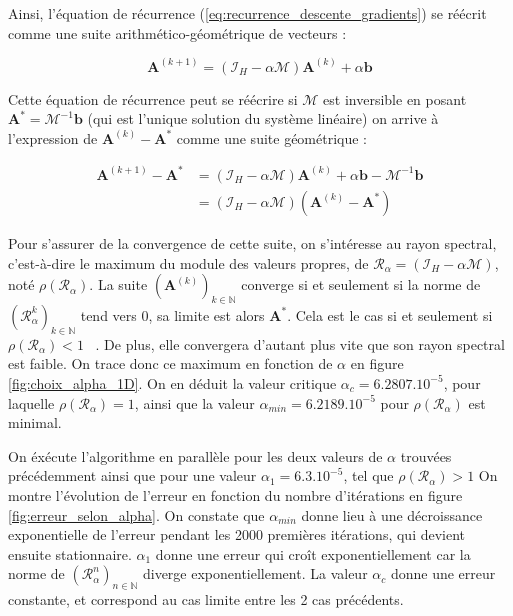 \documentclass[12pt]{report}
\begin{document}
Ainsi, l'équation de récurrence (\ref{eq:recurrence_descente_gradients}) se réécrit comme une suite arithmético-géométrique de vecteurs :

\begin{equation}
    \bm{A}^{(k+1)} = (\mathcal{I}_H - \alpha \mathcal{M} )  \bm{A}^{(k)} + \alpha\bm{b}
    \label{eq:recurrence_descente_gradients_v2}
\end{equation}

Cette équation de récurrence peut se réécrire si $\mathcal M$ est inversible en posant $\bm{A^*} = \mathcal {M}^{-1}\bm{b}$ (qui est l'unique solution du système linéaire) on arrive à l'expression de $\bm{A}^{(k)}-\bm{A^*} $ comme une suite géométrique :

\begin{equation}
    \begin{aligned}
        \bm{A}^{(k+1)}-\bm{A^*} & = (\mathcal{I}_H - \alpha \mathcal{M} )  \bm{A}^{(k)} + \alpha\bm{b} - \mathcal {M}^{-1}\bm{b} \\
                                & = (\mathcal{I}_H - \alpha \mathcal{M} ) (\bm{A}^{(k)}-\bm{A^*} )
    \end{aligned}
    \label{eq:recurrence_descente_gradients_2D_v2}
\end{equation}

Pour s'assurer de la convergence de cette suite, on s'intéresse au rayon spectral, c'est-à-dire le maximum du module des valeurs propres, de $\mathcal{R}_\alpha = (\mathcal{I}_H - \alpha \mathcal{M} )$, noté $\rho(\mathcal{R}_\alpha)$.
La suite $(\bm{A}^{(k)})_{k\in \mathbb{N}}$ converge si et seulement si la norme de $(\mathcal{R}_\alpha ^k)_{k\in \mathbb{N}}$ tend vers 0, sa limite est alors $\bm A^*$.
Cela est le cas si et seulement si $\rho(\mathcal{R}_\alpha)<1$ ~\cite{WikiRayonSpectral}.
De plus, elle convergera d'autant plus vite que son rayon spectral est faible.
On trace donc ce maximum en fonction de $\alpha$ en figure \ref{fig:choix_alpha_1D}.
On en déduit la valeur critique $\alpha_c = 6.2807.10^{-5}$, pour laquelle $\rho(\mathcal{R}_\alpha)=1$, ainsi que la valeur $\alpha_{min} = 6.2189.10^{-5}$ pour $\rho(\mathcal{R}_\alpha)$ est minimal.

On éxécute l'algorithme en parallèle pour les deux valeurs de $\alpha$ trouvées précédemment ainsi que pour une valeur $\alpha_1 = 6.3.10^{-5}$, tel que $\rho(\mathcal{R}_\alpha)>1$
On montre l'évolution de l'erreur en fonction du nombre d'itérations en figure \ref{fig:erreur_selon_alpha}.
On constate que $\alpha_{min}$ donne lieu à une décroissance exponentielle de l'erreur pendant les 2000 premières itérations, qui devient ensuite stationnaire.
$\alpha_1$ donne une erreur qui croît exponentiellement car la norme de $(\mathcal{R}_\alpha ^n)_{n\in \mathbb{N}}$ diverge exponentiellement.
La valeur $\alpha_c$ donne une erreur constante, et correspond au cas limite entre les 2 cas précédents.
\end{document}
